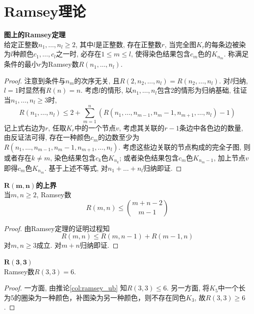 
\section{Ramsey理论}

\begin{thm} \textbf{图上的Ramsey定理}\\
给定正整数$n_1,\dots, n_l\ge 2$, 其中$l$是正整数, 存在正整数$r$, 当完全图$K_r$的每条边被染为$l$种颜色$c_1,\dots,c_l$之一时, 必存在$1\le m\le l$, 使得染色结果包含$c_m$色的$K_{n_m}$. 称满足条件的最小$r$为Ramsey数$R(n_1,\dots, n_l)$. 
\end{thm}
\begin{proof}
注意到条件与$n_m$的次序无关, 且$R(2,n_2,\dots,n_l)=R(n_2,\dots,n_l)$. 对$l$归纳, $l=1$时显然有$R(n)=n$. 考虑$l$的情形, 以$n_1,\dots,n_l$包含2的情形为归纳基础, 往证当$n_1,\dots,n_l\ge 3$时, 
\begin{equation}
    R(n_1,\dots,n_l) \le 2+\sum_{m=1}^n (R(n_1,\dots, n_{m-1},n_m-1,n_{m+1},\dots,n_l)-1)
\label{eq:ramsey_thm}
\end{equation}
记上式右边为$r$, 任取$K_r$中的一个节点$v$, 考虑其关联的$r-1$条边中各色边的数量, 由反证法可得, 存在一种颜色$c_m$的边数至少为$R(n_1,\dots, n_{m-1},n_m-1,n_{m+1},\dots,n_l)$. 考虑这些边关联的节点构成的完全子图, 则或者存在$k\neq m$, 染色结果包含$c_k$色$K_{n_k}$; 或者染色结果包含$c_m$色$K_{n_m-1}$, 加上节点$v$即得$c_m$色$K_{n_m}$. 基于上述不等式, 对$n_1+ \dots+n_l$归纳即证. 
\end{proof}

\begin{col} $\mathbf{R(m,n)}$\textbf{的上界}\\
当$m,n\ge 2$, Ramsey数
\begin{equation}
    R(m,n)\le \binom{m+n-2}{m-1}
\end{equation}
\label{col:ramsey_ub}
\end{col}
\begin{proof}
由Ramsey定理的证明过程知
\begin{equation}
    R(m,n) \le R(m,n-1)+R(m-1,n)
\end{equation}
对$m,n\ge 3$成立. 对$m+n$归纳即证. 
\end{proof}

\begin{pro} $\mathbf{R(3,3)}$\\
Ramsey数$R(3,3)=6$. 
\end{pro}
\begin{proof} 一方面, 由推论\ref{col:ramsey_ub} 知$R(3,3)\le 6$. 另一方面, 将$K_5$中一个长为5的圈染为一种颜色，补图染为另一种颜色，则不存在同色$K_3$, 故$R(3,3)\ge 6$. 
\end{proof}

